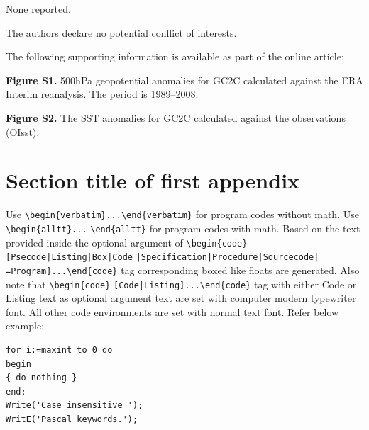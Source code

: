 \documentclass[CJCE,STIX2COL]{WileyNJD-v2}
\begin{document}

None reported.


The authors declare no potential conflict of interests.


The following supporting information is available as part of the online article:

\noindent
\textbf{Figure S1.}
{500{\uns}hPa geopotential anomalies for GC2C calculated against the ERA Interim reanalysis. The period is 1989--2008.}

\noindent
\textbf{Figure S2.}
{The SST anomalies for GC2C calculated against the observations (OIsst).}

\nocite{*}%
%

\appendix

\section{Section title of first appendix\label{app1}}

Use \verb+\begin{verbatim}...+\verb+\end{verbatim}+ for program codes without math. Use \verb+\begin{alltt}...+ \verb+\end{alltt}+ for program codes with math. Based on the text provided inside the optional argument of \verb+\begin{code}[Psecode|Listing|Box|Code+ \verb+|Specification|Procedure|Sourcecode|+ \verb+=Program]...\end{code}+ tag corresponding boxed like floats are generated. Also note that \verb+\begin{code}+ \verb+[Code|Listing]...\end{code}+ tag with either Code or Listing text as optional argument text are set with computer modern typewriter font.  All other code environments are set with normal text font. Refer below example:

\begin{lstlisting}[caption={\quad Descriptive Caption Text},label=DescriptiveLabel]
for i:=maxint to 0 do
begin
{ do nothing }
end;
Write('Case insensitive ');
WritE('Pascal keywords.');
\end{lstlisting}
\end{document}

